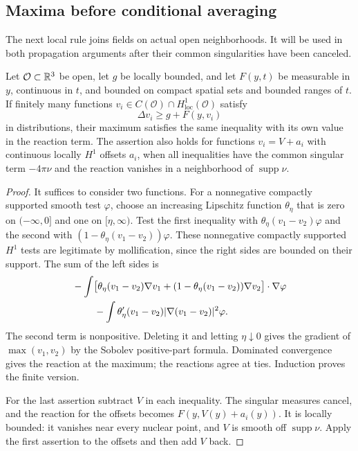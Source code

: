 \subsection{Maxima before conditional averaging}

The next local rule joins fields on actual open neighborhoods. It will be
used in both propagation arguments after their common singularities have
been canceled.

\begin{lemma}
\label{lem:maximum}
Let $\mathcal O\subset\mathbb R^3$ be open, let $g$ be locally bounded, and let
$F(y,t)$ be measurable in $y$, continuous in $t$, and bounded on compact
spatial sets and bounded ranges of $t$.  If finitely many functions
$v_i\in C(\mathcal O)\cap H^1_{\mathrm{loc}}(\mathcal O)$ satisfy
\[
 \Delta v_i\ge g+F(y,v_i)
\]
in distributions, their maximum satisfies the same inequality with its
own value in the reaction term.  The assertion also holds for functions
$v_i=V+a_i$ with continuous locally $H^1$ offsets $a_i$, when all
inequalities have the common singular term $-4\pi\nu$ and the reaction
vanishes in a neighborhood of $\operatorname{supp}\nu$.
\end{lemma}

\begin{proof}
It suffices to consider two functions.  For a nonnegative compactly
supported smooth test $\varphi$, choose an increasing Lipschitz function
$\theta_\eta$ that is zero on $(-\infty,0]$ and one on
$[\eta,\infty)$.  Test the first inequality with
$\theta_\eta(v_1-v_2)\varphi$ and the second with
$(1-\theta_\eta(v_1-v_2))\varphi$.  These nonnegative compactly
supported $H^1$ tests are legitimate by mollification, since the right
sides are bounded on their support.  The sum of the left sides is
\begin{align*}
 &-\int\bigl[\theta_\eta(v_1-v_2)\nabla v_1
       +(1-\theta_\eta(v_1-v_2))\nabla v_2\bigr]\cdot\nabla\varphi\\
 &\hspace{8mm}
 -\int\theta_\eta'(v_1-v_2)|\nabla(v_1-v_2)|^2\varphi.
\end{align*}
The second term is nonpositive.  Deleting it and letting $\eta\downarrow0$
gives the gradient of $\max(v_1,v_2)$ by the Sobolev positive-part
formula.  Dominated convergence gives the reaction at the maximum;
the reactions agree at ties.  Induction proves the finite version.

For the last assertion subtract $V$ in each inequality.  The singular
measures cancel, and the reaction for the offsets becomes
$F(y,V(y)+a_i(y))$. It is locally bounded: it vanishes near every
nuclear point, and $V$ is smooth off $\operatorname{supp}\nu$.
Apply the first assertion to
the offsets and then add $V$ back.
\end{proof}

